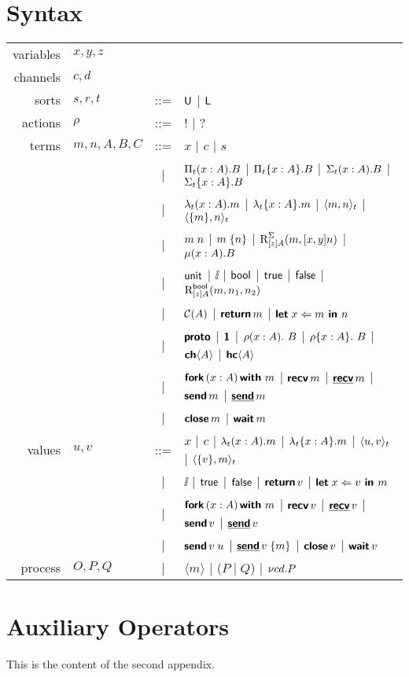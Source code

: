 \section{Syntax}

\begin{center}
  \begin{tabular}{r l c l}
    variables & $x, y, z$   &     &                 \\
    channels  & $c, d$      &     &                 \\
    sorts     & $s, r, t$   & ::= & $\textsf{U}$ | $\textsf{L}$   \\
    actions   & $\rho$      & ::= & $!$ | $?$       \\
    terms     & $m,n,A,B,C$ & ::= & $x$ | $c$ | $s$ \\
              &             & \;| & $\Pi_{t}({x : A}).{B}$ | $\Pi_{t}\{{x : A}\}.{B}$
                                    | $\Sigma_{t}({x : A}).{B}$ | $\Sigma_{t}\{{x : A}\}.{B}$ \\
              &             & \;| & $\lambda_{t}({x : A}).{m}$ | $\lambda_{t}\{{x : A}\}.{m}$
                                    | $\langle{{m},{n}}\rangle_{t}$ | $\langle{\{{m}\},{n}}\rangle_{t}$ \\
              &             & \;| & ${m}\;{n}$ | ${m}\;\{{n}\}$ | $\text{R}_{[z]A}^{\Sigma}({m},{[x,y]n})$ | $\mu({x : A}).{B}$ \\
              &             & \;| & $\textsf{unit}$ | $\ii$ | $\textsf{bool}$ | $\textsf{true}$ | $\textsf{false}$
                                    | $\text{R}_{[z]A}^{\textsf{bool}}({m},{n_{1}},{n_{2}})$ \\
              &             & \;| & $\mathcal{C}({A})$ | $\textbf{\textsf{return}}\,{m}$ | $\textbf{\textsf{let}}\;{x}\Leftarrow{m}\textbf{\textsf{ in }}{n}$ \\
              &             & \;| & $\textbf{\textsf{proto}}$ | $\textbf{\textsf{1}}$
                                    | ${{\rho}({x : A}).\ {B}}$ | ${{\rho}\{{x : A}\}.\ {B}}$ | ${\textbf{\textsf{ch}}\langle{A}\rangle}$ | ${\textbf{\textsf{hc}}\langle{A}\rangle}$ \\
              &             & \;| & $\textbf{\textsf{fork}}\,({x : A})\,\textbf{\textsf{with}}\ {m}$ | $\textbf{\textsf{recv}}\,{m}$ | $\underline{\textbf{\textsf{recv}}}\,{m}$
                                    | $\textbf{\textsf{send}}\,{m}$ | $\underline{\textbf{\textsf{send}}}\,{m}$ \\
              &             & \;| & $\textbf{\textsf{close}}\,{m}$ | $\textbf{\textsf{wait}}\,{m}$ \\
    values    & $u, v$      & ::= & $x$ | $c$ | $\lambda_{t}({x : A}).{m}$ | $\lambda_{t}\{{x : A}\}.{m}$
                                    | $\langle{{u},{v}}\rangle_{t}$ | $\langle{\{{v}\},{m}}\rangle_{t}$ \\
              &             & \;| & $\ii$ | $\textsf{true}$ | $\textsf{false}$ | $\textbf{\textsf{return}}\,{v}$ | $\textbf{\textsf{let}}\;{x}\Leftarrow{v}\textbf{\textsf{ in }}{m}$ \\
              &             & \;| & $\textbf{\textsf{fork}}\,({x : A})\,\textbf{\textsf{with}}\ {m}$ | $\textbf{\textsf{recv}}\,{v}$ | $\underline{\textbf{\textsf{recv}}}\,{v}$ | $\textbf{\textsf{send}}\,{v}$ | $\underline{\textbf{\textsf{send}}}\,{v}$ \\
              &             & \;| & ${\textbf{\textsf{send}}\,{v}}\;{u}$ | ${\underline{\textbf{\textsf{send}}}\,{v}}\;\{{m}\}$ | $\textbf{\textsf{close}}\,{v}$ | $\textbf{\textsf{wait}}\,{v}$ \\
    process   & $O, P, Q$   & \;| & $\langle m \rangle$ | ($P \mid Q$) | ${\nu{cd}.{P}}$
  \end{tabular}
\end{center}

\section{Auxiliary Operators}
This is the content of the second appendix.

